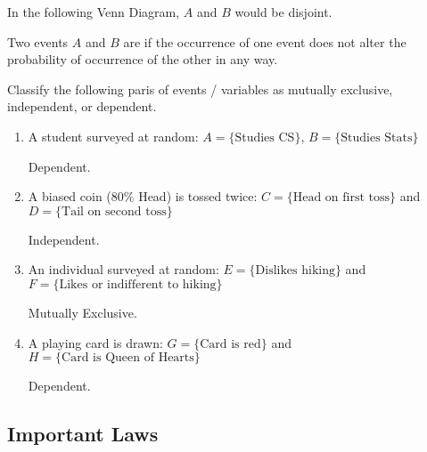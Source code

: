 In the following Venn Diagram, $A$ and $B$ would be disjoint.

\begin{center}
\end{center}

\begin{definition}[Independent]
    Two events $A$ and $B$ are  if the occurrence of one event does not alter the probability of occurrence of the other in any way. 
\end{definition}

\begin{example}
    Classify the following paris of events / variables as mutually exclusive, independent, or dependent. 

    \begin{enumerate}[label=\alph*)]
        \item A student surveyed at random: $A = \{ \text{Studies CS} \}$, $B = \{ \text{Studies Stats} \}$

        Dependent. 

        \item A biased coin ($80\%$ Head) is tossed twice: $C = \{ \text{Head on first toss} \}$ and $D = \{ \text{Tail on second toss} \}$

        Independent. 

        \item An individual surveyed at random: $E = \{ \text{Dislikes hiking} \}$ and $F = \{ \text{Likes or indifferent to hiking} \}$

        Mutually Exclusive. 

        \item A playing card is drawn: $G = \{ \text{Card is red} \}$ and $H = \{ \text{Card is Queen of Hearts} \}$

        Dependent. 
    \end{enumerate}
\end{example}

\subsection{Important Laws}

